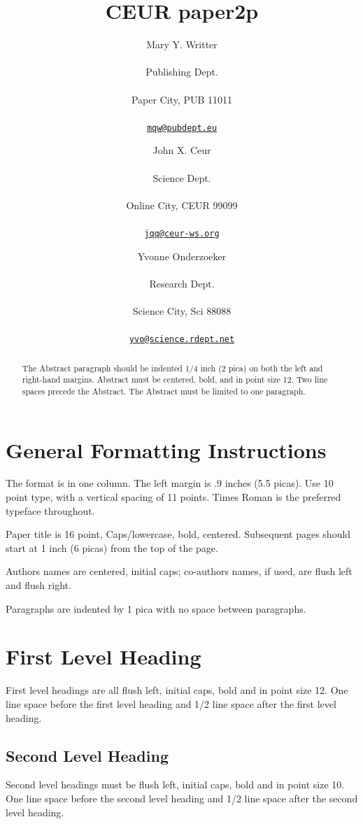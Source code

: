 \documentclass[a4paper]{article}
\title{CEUR paper2p}
\author{

Mary Y. Writter

 \\ Publishing Dept.

 \\ Paper City, PUB 11011

 \\ \href{mailto:mqw@pubdept.eu}{\nolinkurl{mqw@pubdept.eu}}

\and


John X. Ceur

 \\ Science Dept.

 \\ Online City, CEUR 99099

 \\ \href{mailto:jqq@ceur-ws.org}{\nolinkurl{jqq@ceur-ws.org}}

\and


Yvonne Onderzoeker

 \\ Research Dept.

 \\ Science City, Sci 88088

 \\ \href{mailto:yvo@science.rdept.net}{\nolinkurl{yvo@science.rdept.net}}

\and

}
\begin{document}
\maketitle

\begin{abstract}
The Abstract paragraph should be indented 1/4 inch (2 pica) on both the
left and right-hand margins. Abstract must be centered, bold, and in
point size 12. Two line spaces precede the Abstract. The Abstract must
be limited to one paragraph.
\end{abstract}

\hypertarget{general-formatting-instructions}{%
\section{General Formatting
Instructions}\label{general-formatting-instructions}}

The format is in one column. The left margin is .9 inches (5.5 picas).
Use 10 point type, with a vertical spacing of 11 points. Times Roman is
the preferred typeface throughout.

Paper title is 16 point, Caps/lowercase, bold, centered. Subsequent
pages should start at 1 inch (6 picas) from the top of the page.

Authors names are centered, initial caps; co-authors names, if used, are
flush left and flush right.

Paragraphs are indented by 1 pica with no space between paragraphs.

\hypertarget{first-level-heading}{%
\section{First Level Heading}\label{first-level-heading}}

First level headings are all flush left, initial caps, bold and in point
size 12. One line space before the first level heading and 1/2 line
space after the first level heading.

\hypertarget{second-level-heading}{%
\subsection{Second Level Heading}\label{second-level-heading}}

Second level headings must be flush left, initial caps, bold and in
point size 10. One line space before the second level heading and 1/2
line space after the second level heading.
\end{document}
